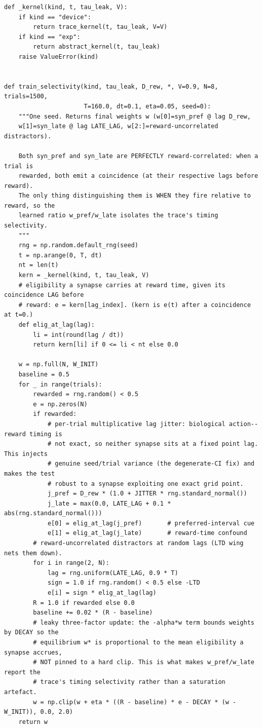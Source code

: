 \begin{lstlisting}[caption={mrl\_trace/selectivity.py},label={lst:siox-src-selectivity}]
def _kernel(kind, t, tau_leak, V):
    if kind == "device":
        return trace_kernel(t, tau_leak, V=V)
    if kind == "exp":
        return abstract_kernel(t, tau_leak)
    raise ValueError(kind)


def train_selectivity(kind, tau_leak, D_rew, *, V=0.9, N=8, trials=1500,
                      T=160.0, dt=0.1, eta=0.05, seed=0):
    """One seed. Returns final weights w (w[0]=syn_pref @ lag D_rew,
    w[1]=syn_late @ lag LATE_LAG, w[2:]=reward-uncorrelated distractors).

    Both syn_pref and syn_late are PERFECTLY reward-correlated: when a trial is
    rewarded, both emit a coincidence (at their respective lags before reward).
    The only thing distinguishing them is WHEN they fire relative to reward, so the
    learned ratio w_pref/w_late isolates the trace's timing selectivity.
    """
    rng = np.random.default_rng(seed)
    t = np.arange(0, T, dt)
    nt = len(t)
    kern = _kernel(kind, t, tau_leak, V)
    # eligibility a synapse carries at reward time, given its coincidence LAG before
    # reward: e = kern[lag_index]. (kern is e(t) after a coincidence at t=0.)
    def elig_at_lag(lag):
        li = int(round(lag / dt))
        return kern[li] if 0 <= li < nt else 0.0

    w = np.full(N, W_INIT)
    baseline = 0.5
    for _ in range(trials):
        rewarded = rng.random() < 0.5
        e = np.zeros(N)
        if rewarded:
            # per-trial multiplicative lag jitter: biological action--reward timing is
            # not exact, so neither synapse sits at a fixed point lag. This injects
            # genuine seed/trial variance (the degenerate-CI fix) and makes the test
            # robust to a synapse exploiting one exact grid point.
            j_pref = D_rew * (1.0 + JITTER * rng.standard_normal())
            j_late = max(0.0, LATE_LAG + 0.1 * abs(rng.standard_normal()))
            e[0] = elig_at_lag(j_pref)       # preferred-interval cue
            e[1] = elig_at_lag(j_late)       # reward-time confound
        # reward-uncorrelated distractors at random lags (LTD wing nets them down).
        for i in range(2, N):
            lag = rng.uniform(LATE_LAG, 0.9 * T)
            sign = 1.0 if rng.random() < 0.5 else -LTD
            e[i] = sign * elig_at_lag(lag)
        R = 1.0 if rewarded else 0.0
        baseline += 0.02 * (R - baseline)
        # leaky three-factor update: the -alpha*w term bounds weights by DECAY so the
        # equilibrium w* is proportional to the mean eligibility a synapse accrues,
        # NOT pinned to a hard clip. This is what makes w_pref/w_late report the
        # trace's timing selectivity rather than a saturation artefact.
        w = np.clip(w + eta * ((R - baseline) * e - DECAY * (w - W_INIT)), 0.0, 2.0)
    return w



\end{lstlisting}
